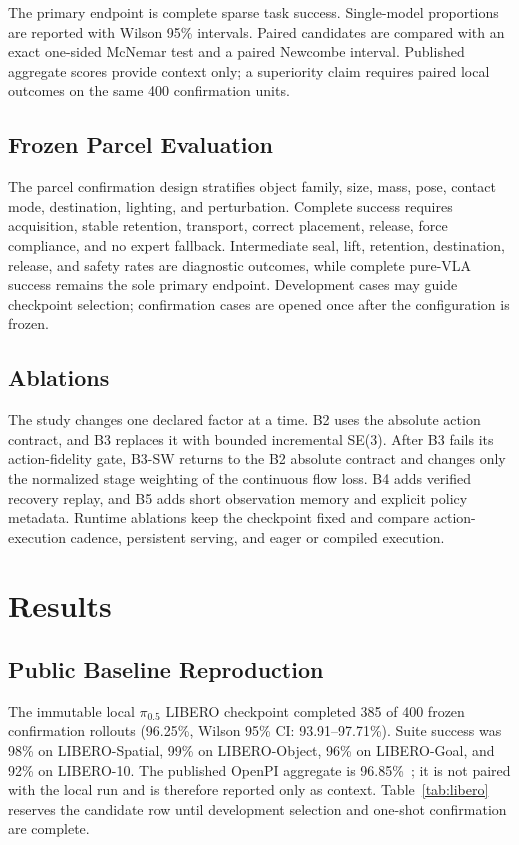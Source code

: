 \documentclass[11pt]{article}
\begin{document}
The primary endpoint is complete sparse task success. Single-model proportions
are reported with Wilson 95\% intervals. Paired candidates are compared with an
exact one-sided McNemar test and a paired Newcombe interval. Published aggregate
scores provide context only; a superiority claim requires paired local outcomes
on the same 400 confirmation units.

\subsection{Frozen Parcel Evaluation}

The parcel confirmation design stratifies object family, size, mass, pose,
contact mode, destination, lighting, and perturbation. Complete success requires
acquisition, stable retention, transport, correct placement, release, force
compliance, and no expert fallback. Intermediate seal, lift, retention,
destination, release, and safety rates are diagnostic outcomes, while complete
pure-VLA success remains the sole primary endpoint. Development cases may guide
checkpoint selection; confirmation cases are opened once after the configuration
is frozen.

\subsection{Ablations}

The study changes one declared factor at a time. B2 uses the absolute action
contract, and B3 replaces it with bounded incremental SE(3). After B3 fails its
action-fidelity gate, B3-SW returns to the B2 absolute contract and changes only
the normalized stage weighting of the continuous flow loss. B4 adds verified
recovery replay, and B5 adds short observation memory and explicit policy
metadata. Runtime
ablations keep the checkpoint fixed and compare action-execution cadence,
persistent serving, and eager or compiled execution.

\section{Results}

\subsection{Public Baseline Reproduction}

The immutable local $\pi_{0.5}$ LIBERO checkpoint completed 385 of 400 frozen
confirmation rollouts (96.25\%, Wilson 95\% CI: 93.91--97.71\%). Suite success
was 98\% on LIBERO-Spatial, 99\% on LIBERO-Object, 96\% on LIBERO-Goal, and
92\% on LIBERO-10. The published OpenPI aggregate is 96.85\%~\citep{openpi};
it is not paired with the local run and is therefore reported only as context.
Table~\ref{tab:libero} reserves the candidate row until development selection
and one-shot confirmation are complete.
\end{document}
